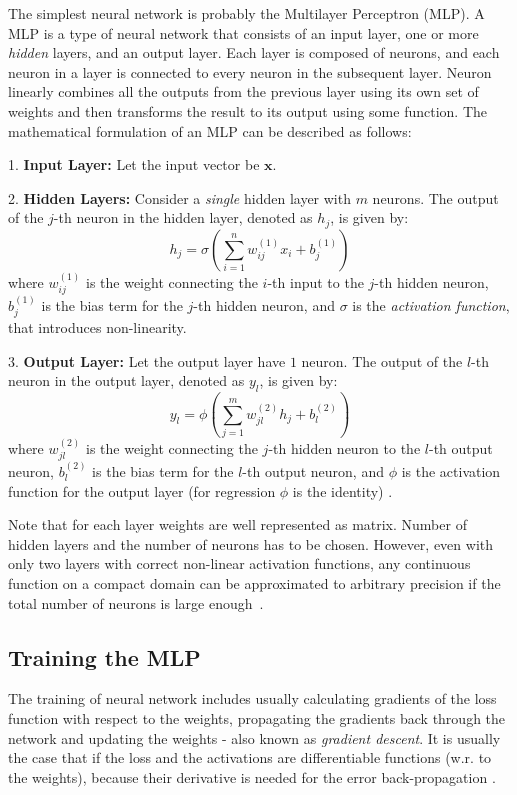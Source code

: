 The simplest neural network is probably the  Multilayer Perceptron (MLP). A MLP is a type of neural network that consists of an input layer, one or more \textit{hidden} layers, and an output layer. Each layer is composed of neurons, and each neuron in a layer is connected to every neuron in the subsequent layer. Neuron linearly combines all the outputs from the previous layer using its own set of weights and then transforms the result to its output using some function. The mathematical formulation of an MLP can be described as follows:

1. \textbf{Input Layer:} Let the input vector be $\bm{x}$.

2. \textbf{Hidden Layers:} Consider a \textit{single} hidden layer with $m$ neurons. The output of the $j$-th neuron in the hidden layer, denoted as $h_j$, is given by:
\begin{equation}
	h_j = \sigma\left( \sum_{i=1}^{n} w_{ij}^{(1)} x_i + b_j^{(1)} \right)
\end{equation}
where $w_{ij}^{(1)}$ is the weight connecting the $i$-th input to the $j$-th hidden neuron, $b_j^{(1)}$ is the bias term for the $j$-th hidden neuron, and $\sigma$ is the \textit{activation function}, that introduces non-linearity.

3. \textbf{Output Layer:} Let the output layer have $1$ neuron. The output of the $l$-th neuron in the output layer, denoted as $y_l$, is given by:
\begin{equation}
	y_l = \phi\left( \sum_{j=1}^{m} w_{jl}^{(2)} h_j + b_l^{(2)} \right)
\end{equation}
where $w_{jl}^{(2)}$ is the weight connecting the $j$-th hidden neuron to the $l$-th output neuron, $b_l^{(2)}$ is the bias term for the $l$-th output neuron, and $\phi$ is the activation function for the output layer (for regression $\phi$ is the identity) \cite{bishop2006}.

Note that for each layer weights are well represented as matrix. Number of hidden layers and the number of neurons has to be chosen. However, even with only two layers with correct non-linear activation functions, any continuous function on a compact domain can be approximated to arbitrary precision if the total number of neurons is large enough~\cite{bishop2006}.

\subsection*{Training the MLP}
The training of neural network includes usually calculating gradients of the loss function with respect to the weights, propagating the gradients back through the network and updating the weights - also known as \textit{gradient descent}. It is usually the case that if the loss and the activations are differentiable functions (w.r. to the weights), because their derivative is needed for the error back-propagation \cite{bishop2006}.

